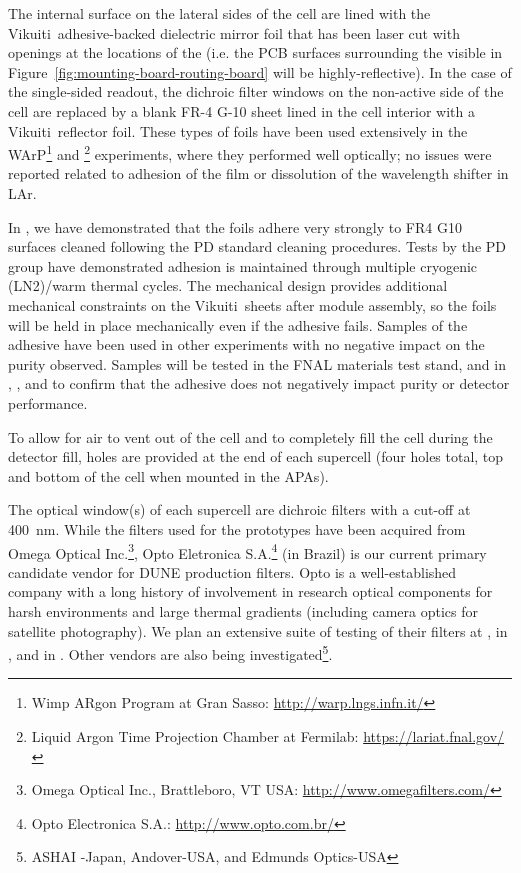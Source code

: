 The  internal surface on the lateral sides of the cell are lined with the Vikuiti\texttrademark\ adhesive-backed dielectric mirror foil
that has been laser cut with openings at the locations of the  (i.e. the PCB surfaces surrounding the  visible in Figure~\ref{fig:mounting-board-routing-board} will be highly-reflective).  In the case of the single-sided readout, the dichroic filter windows on the non-active side of the cell are replaced by a blank FR-4 G-10 sheet lined in the cell interior with a Vikuiti\texttrademark\ reflector foil.
These types of foils have been used extensively in the WArP\footnote{Wimp ARgon Program at Gran Sasso: \url{http://warp.lngs.infn.it/}} and \footnote{Liquid Argon Time Projection Chamber at Fermilab: \url{https://lariat.fnal.gov/}} experiments, where they performed well optically; no issues were reported related to adhesion of the film or dissolution of the wavelength shifter in LAr.

In , we have demonstrated that the foils adhere very strongly to FR4 G10 surfaces cleaned following the PD standard cleaning procedures.  Tests by the PD group have demonstrated adhesion is maintained through multiple cryogenic (LN2)/warm thermal cycles.  The mechanical design provides additional mechanical constraints on the Vikuiti\texttrademark\ sheets after module assembly, so the foils will be held in place mechanically even if the adhesive fails.  Samples of the adhesive have been used in other experiments with no negative impact on the  purity observed.  Samples will be tested in the FNAL materials test stand, and in , , and  to confirm that the adhesive does not negatively impact  purity or detector performance.

To allow for air to vent out of the cell and  to completely fill the cell during the detector fill, holes are provided at the end of each supercell (four holes total, top and bottom of the cell when mounted in the APAs).

The optical window(s) of each supercell are dichroic filters with a cut-off at \SI{400}{nm}. While the filters used for the  prototypes have been acquired from Omega Optical Inc.\footnote{Omega Optical Inc., Brattleboro, VT USA: \url{http://www.omegafilters.com/}}, Opto Eletronica S.A.\footnote{Opto Electronica S.A.: \url{http://www.opto.com.br/}} (in Brazil) is our current primary candidate vendor for DUNE production filters.  Opto is a well-established company with a long history of involvement in research optical components for harsh environments and large thermal gradients (including camera optics for satellite photography).  We plan an extensive suite of testing of their filters at , in , and in . Other vendors are also being investigated\footnote{ASHAI -Japan, Andover-USA, and Edmunds Optics-USA}.

